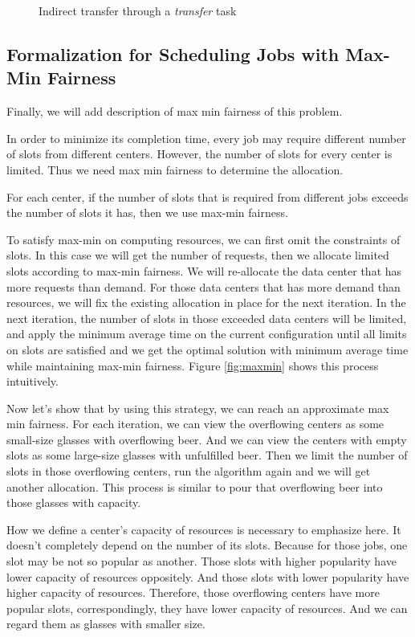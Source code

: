 \documentclass{llncs}
\begin{document}
\begin{figure}
    \centering
    
    \caption{Indirect transfer through a \emph{transfer} task}
    \label{fig:my_label}
\end{figure}

\subsection{Formalization for Scheduling Jobs with Max-Min Fairness}\label{sec:maxmin}

Finally, we will add description of max min fairness of this problem.

In order to minimize its completion time, every job may require different number of slots from different centers. However, the number of slots for every center is limited. Thus we need max min fairness to determine the allocation.

For each center, if the number of slots that is required from different jobs exceeds the number of slots it has, then we use max-min fairness. 

To satisfy max-min on computing resources, we can first omit the constraints of slots. In this case we will get the number of requests, then we allocate limited slots according to max-min fairness. We will re-allocate the data center that has more requests than demand. For those data centers that has more demand than resources, we will fix the existing allocation in place for the next iteration. In the next iteration, the number of slots in those exceeded data centers will be limited, and apply the minimum average time on the current configuration until all limits on slots are satisfied and we get the optimal solution with minimum average time while maintaining max-min fairness. Figure \ref{fig:maxmin} shows this process intuitively.

Now let's show that by using this strategy, we can reach an approximate max min fairness. For each iteration, we can view the overflowing centers as some small-size glasses with overflowing beer. And we can view the centers with empty slots as some large-size glasses with unfulfilled beer. Then we limit the number of slots in those overflowing centers, run the algorithm again and we will get another allocation. This process is similar to pour that overflowing beer into those glasses with capacity.

How we define a center's capacity of resources is necessary to emphasize here. It doesn't completely depend on the number of its slots. Because for those jobs, one slot may be not so popular as another. Those slots with higher popularity have lower capacity of resources oppositely. And those slots with lower popularity have higher capacity of resources. Therefore, those overflowing centers have more popular slots, correspondingly, they have lower capacity of resources. And we can regard them as glasses with smaller size.
\end{document}
